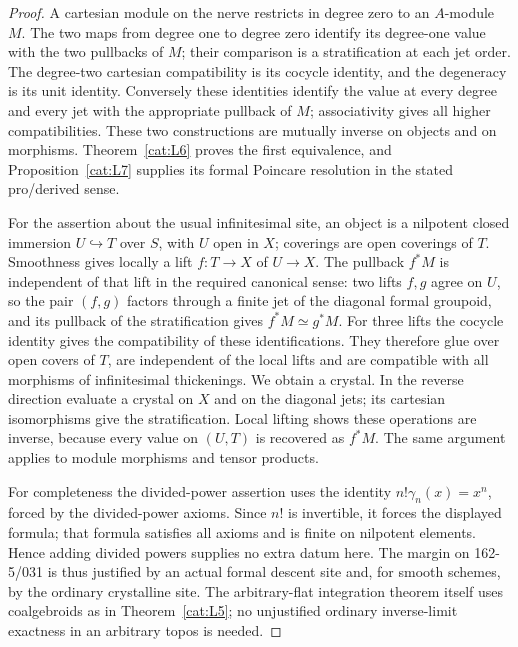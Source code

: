 \begin{proof}
A cartesian module on the nerve restricts in degree zero to an
$A$-module $M$.  The two maps from degree one to degree zero identify
its degree-one value with the two pullbacks of $M$; their comparison
is a stratification at each jet order.  The degree-two cartesian
compatibility is its cocycle identity, and the degeneracy is its
unit identity.  Conversely these identities identify the value at
every degree and every jet with the appropriate pullback of $M$;
associativity gives all higher compatibilities.  These two
constructions are mutually inverse on objects and on morphisms.
Theorem~\ref{cat:L6} proves the first equivalence, and
Proposition~\ref{cat:L7} supplies its formal Poincare resolution in
the stated pro/derived sense.

For the assertion about the usual infinitesimal site, an object is a
nilpotent closed immersion $U\hookrightarrow T$ over $S$, with $U$
open in $X$; coverings are open coverings of $T$.
Smoothness gives locally a lift $f:T\to X$ of $U\to X$.
The pullback $f^*M$ is independent of that lift in the required
canonical sense: two lifts $f,g$ agree on $U$, so the pair $(f,g)$
factors through a finite jet of the diagonal formal groupoid, and
its pullback of the stratification gives
$f^*M\simeq g^*M$.  For three lifts the cocycle identity gives the
compatibility of these identifications.  They therefore glue over
open covers of $T$, are independent of the local lifts and are
compatible with all morphisms of infinitesimal thickenings.  We obtain
a crystal.  In the reverse direction evaluate a crystal on $X$ and
on the diagonal jets; its cartesian isomorphisms give the
stratification.  Local lifting shows these operations are inverse,
because every value on $(U,T)$ is recovered as $f^*M$.
The same argument applies to module morphisms and tensor products.

For completeness the divided-power assertion uses the identity
$n!\gamma_n(x)=x^n$, forced by the divided-power axioms.  Since $n!$
is invertible, it forces the displayed formula; that formula satisfies
all axioms and is finite on nilpotent elements.  Hence adding divided
powers supplies no extra datum here.
The margin on 162-5/031 is thus justified by an actual formal descent
site and, for smooth schemes, by the ordinary crystalline site.  The
arbitrary-flat integration theorem itself uses coalgebroids as in
Theorem~\ref{cat:L5}; no unjustified ordinary inverse-limit exactness
in an arbitrary topos is needed.
\end{proof}
